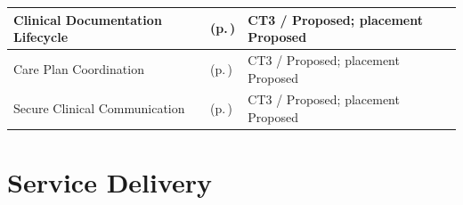 \begin{longtable}{|>{\raggedright\arraybackslash}p{0.37\TableWidth}|>{\raggedright\arraybackslash}p{0.4\TableWidth}|>{\raggedright\arraybackslash}p{0.23\TableWidth}|}
Clinical Documentation Lifecycle & \nameref{cap:bec-reviewed-clinical-documentation-lifecycle-administration} (p.\,\pageref{cap:bec-reviewed-clinical-documentation-lifecycle-administration}) & CT3 / Proposed; placement Proposed\\\hline
Care Plan Coordination & \nameref{cap:bec-reviewed-care-plan-lifecycle-coordination} (p.\,\pageref{cap:bec-reviewed-care-plan-lifecycle-coordination}) & CT3 / Proposed; placement Proposed\\\hline
Secure Clinical Communication & \nameref{cap:bec-reviewed-secure-clinical-communication} (p.\,\pageref{cap:bec-reviewed-secure-clinical-communication}) & CT3 / Proposed; placement Proposed\\\hline
\end{longtable}\endgroup
\section{Service Delivery}
\begingroup\small\setlength{\TableWidth}{\dimexpr\linewidth-6\tabcolsep-4\arrayrulewidth\relax}
